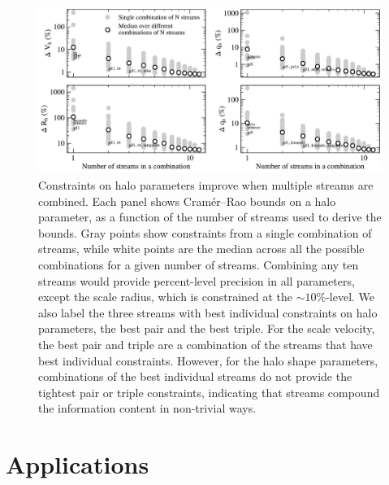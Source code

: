 \documentclass[modern]{aastex61}
\begin{document}
\begin{figure}
\begin{center}
\includegraphics[width=\textwidth]{nstream_improvement.pdf}
\caption{Constraints on halo parameters improve when multiple streams are combined.
Each panel shows Cram\'er--Rao bounds on a halo parameter, as a function of the number of streams used to derive the bounds.
Gray points show constraints from a single combination of streams, while white points are the median across all the possible combinations for a given number of streams.
Combining any ten streams would provide percent-level precision in all parameters, except the scale radius, which is constrained at the $\sim10\%$-level.
We also label the three streams with best individual constraints on halo parameters, the best pair and the best triple.
For the scale velocity, the best pair and triple are a combination of the streams that have best individual constraints.
However, for the halo shape parameters, combinations of the best individual streams do not provide the tightest pair or triple constraints, indicating that streams compound the information content in non-trivial ways.
}
\label{fig:nstream_summary}
\end{center}
\end{figure}

\section{Applications}
\end{document}

